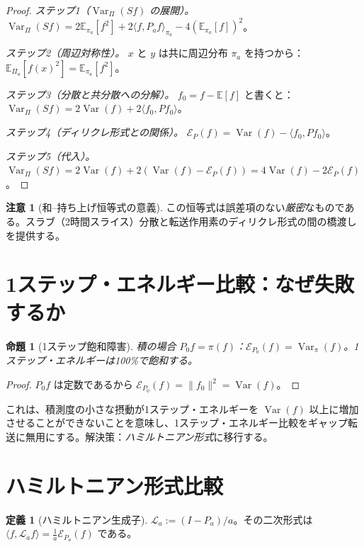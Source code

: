 \documentclass[12pt]{article}
\theoremstyle{plain}
\newtheorem{proposition}[theorem]{命題}
\theoremstyle{definition}
\newtheorem{definition}[theorem]{定義}
\newtheorem{remark}[theorem]{注意}
\numberwithin{equation}{section}
\newcommand{\Var}{\operatorname{Var}}
\begin{document}
\begin{proof}
\emph{ステップ1（$\Var_\Pi(Sf)$ の展開）。}
$\Var_\Pi(Sf)=2\mathbb{E}_{\pi_a}[f^2]+2\langle f,P_a f\rangle_{\pi_a}-4(\mathbb{E}_{\pi_a}[f])^2$。

\emph{ステップ2（周辺対称性）。} $x$ と $y$ は共に周辺分布 $\pi_a$ を持つから：$\mathbb{E}_{\Pi_a}[f(x)^2]=\mathbb{E}_{\pi_a}[f^2]$。

\emph{ステップ3（分散と共分散への分解）。} $f_0=f-\mathbb{E}[f]$ と書くと：$\Var_\Pi(Sf)=2\Var(f)+2\langle f_0,Pf_0\rangle$。

\emph{ステップ4（ディリクレ形式との関係）。} $\mathcal{E}_P(f)=\Var(f)-\langle f_0,Pf_0\rangle$。

\emph{ステップ5（代入）。} $\Var_\Pi(Sf)=2\Var(f)+2(\Var(f)-\mathcal{E}_P(f))=4\Var(f)-2\mathcal{E}_P(f)$。
\end{proof}

\begin{remark}[和--持ち上げ恒等式の意義]
この恒等式は誤差項のない\emph{厳密}なものである。スラブ（2時間スライス）分散と転送作用素のディリクレ形式の間の橋渡しを提供する。
\end{remark}


\section{1ステップ・エネルギー比較：なぜ失敗するか}\label{sec:onestepfail}

\begin{proposition}[1ステップ飽和障害]\label{prop:saturation}
積の場合 $P_0f=\pi(f)$：$\mathcal{E}_{P_0}(f)=\Var_\pi(f)$。1ステップ・エネルギーは100\%で飽和する。
\end{proposition}

\begin{proof}
$P_0 f$ は定数であるから $\mathcal{E}_{P_0}(f)=\|f_0\|^2=\Var(f)$。
\end{proof}

これは、積測度の小さな摂動が1ステップ・エネルギーを $\Var(f)$ 以上に増加させることができないことを意味し、1ステップ・エネルギー比較をギャップ転送に無用にする。解決策：\emph{ハミルトニアン形式}に移行する。


\section{ハミルトニアン形式比較}\label{sec:hamform}

\begin{definition}[ハミルトニアン生成子]
$\mathcal{L}_a:=(I-P_a)/a$。その二次形式は $\langle f,\mathcal{L}_a f\rangle=\frac{1}{a}\mathcal{E}_{P_a}(f)$ である。
\end{definition}
\end{document}
